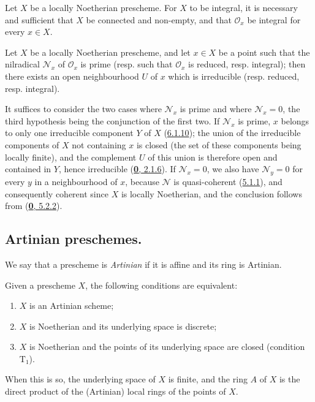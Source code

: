 \begin{corollary}[6.1.12]
\label{I.6.1.12}
Let $X$ be a locally Noetherian prescheme. For $X$ to be integral, it is
necessary and sufficient that $X$ be connected and non-empty, and that
$\mathscr{O}_x$ be integral for every $x\in X$.
\end{corollary}

\begin{proposition}[6.1.13]
\label{I.6.1.13}
Let $X$ be a locally Noetherian prescheme, and let $x\in X$ be a point such
that the nilradical $\mathscr{N}_x$ of $\mathscr{O}_x$ is prime \textup{(resp.} such
that $\mathscr{O}_x$ is reduced, \textup{resp.} integral); then there exists an open
neighbourhood $U$ of $x$ which is irreducible \textup{(resp.} reduced, \textup{resp.}
integral).
\end{proposition}

It suffices to consider the two cases where $\mathscr{N}_x$ is prime and where
$\mathscr{N}_x=0$, the third hypothesis being the conjunction of the first
two. If $\mathscr{N}_x$ is prime, $x$ belongs to only one irreducible
component $Y$ of $X$ (\hyperref[I.6.1.10]{6.1.10}); the union of the
irreducible components of $X$ not containing $x$ is closed
(the set of these components being locally finite), and the complement
$U$ of this union is therefore open and contained in $Y$, hence irreducible
(\hyperref[0.2.1.6]{\textbf{0}, 2.1.6}). If $\mathscr{N}_x=0$, we also have
$\mathscr{N}_y=0$ for every $y$ in a neighbourhood of $x$, because
$\mathscr{N}$ is quasi-coherent (\hyperref[I.5.1.1]{5.1.1}), and
consequently coherent since $X$ is locally Noetherian, and the conclusion
follows from (\hyperref[0.5.2.2]{\textbf{0}, 5.2.2}).

\subsection{Artinian preschemes.}
\label{subsection:I.6.2}

\begin{definition}[6.2.1]
\label{I.6.2.1}
We say that a prescheme is \emph{Artinian} if it is affine and its ring is
Artinian.
\end{definition}

\begin{proposition}[6.2.2]
\label{I.6.2.2}
Given a prescheme $X$, the following conditions are equivalent:
\begin{enumerate}
  \item[a)] $X$ is an Artinian scheme;
  \item[b)] $X$ is Noetherian and its underlying space is discrete;
  \item[c)] $X$ is Noetherian and the points of its underlying space are
    closed \textup{(condition $\mathrm{T}_1$)}.
\end{enumerate}

When this is so, the underlying space of $X$ is finite, and the ring $A$
of $X$ is the direct product of the (Artinian) local rings of the points of
$X$.
\end{proposition}

